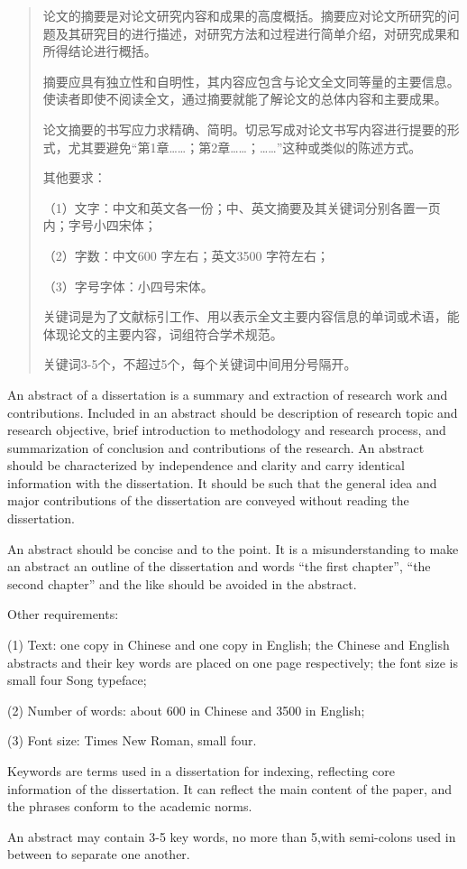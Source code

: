 \begin{abstract}

论文的摘要是对论文研究内容和成果的高度概括。摘要应对论文所研究的问题及其研究目的进行描述，对研究方法和过程进行简单介绍，对研究成果和所得结论进行概括。

摘要应具有独立性和自明性，其内容应包含与论文全文同等量的主要信息。使读者即使不阅读全文，通过摘要就能了解论文的总体内容和主要成果。

论文摘要的书写应力求精确、简明。切忌写成对论文书写内容进行提要的形式，尤其要避免“第1章……；第2章……；……”这种或类似的陈述方式。

其他要求：

（1）文字：中文和英文各一份；中、英文摘要及其关键词分别各置一页内；字号小四宋体；

（2）字数：中文600 字左右；英文3500 字符左右；

（3）字号字体：小四号宋体。

关键词是为了文献标引工作、用以表示全文主要内容信息的单词或术语，能体现论文的主要内容，词组符合学术规范。

关键词3-5个，不超过5个，每个关键词中间用分号隔开。

\end{abstract}


\begin{enabstract}

An abstract of a dissertation is a summary and extraction of research work and contributions. Included in an abstract should be description of research topic and research objective, brief introduction to methodology and research process, and summarization of conclusion and contributions of the research. An abstract should be characterized by independence and clarity and carry identical information with the dissertation. It should be such that the general idea and major contributions of the dissertation are conveyed without reading the dissertation. 

An abstract should be concise and to the point. It is a misunderstanding to make an abstract an outline of the dissertation and words “the first chapter”, “the second chapter” and the like should be avoided in the abstract. 

Other requirements:

(1) Text: one copy in Chinese and one copy in English; the Chinese and English abstracts and their key words are placed on one page respectively; the font size is small four Song typeface;

(2) Number of words: about 600 in Chinese and 3500 in English;

(3) Font size: Times New Roman, small four.

Keywords are terms used in a dissertation for indexing, reflecting core information of the dissertation. It can reflect the main content of the paper, and the phrases conform to the academic norms.

An abstract may contain 3-5 key words, no more than 5,with semi-colons used in between to separate one another.


\end{enabstract}

